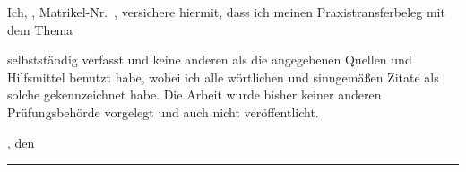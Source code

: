 Ich, \autor, Matrikel-Nr.\ \matrikelnr, versichere hiermit, dass ich meinen Praxistransferbeleg  mit dem Thema
\begin{quote}
\textit{\titel} \textit{\untertitel}
\end{quote}
selbstständig verfasst und keine anderen als die angegebenen Quellen und Hilfsmittel benutzt habe, wobei ich alle wörtlichen und sinngemäßen Zitate als solche gekennzeichnet habe. Die Arbeit wurde bisher keiner anderen Prüfungsbehörde vorgelegt und auch nicht veröffentlicht.


\ort, den 
\newline

\rule[-0.2cm]{5cm}{0.5pt}

\textsc{\autor} 
